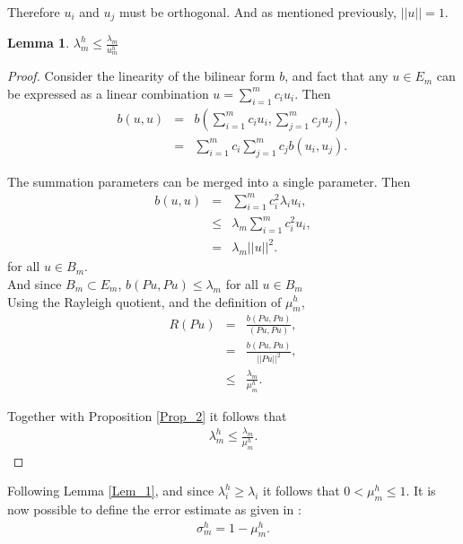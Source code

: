\documentclass[../../main.tex]{subfiles}
\begin{document}
Therefore $u_{i}$ and $u_{j}$ must be orthogonal. And as mentioned previously, $||u|| = 1$.


\newtheorem{Lem_1}{Lemma} \label{Lem_1}
\begin{Lem_1}
	$\displaystyle \lambda_{m}^{h} \leq \frac{\lambda_{m}}{u_{m}^{h}}$
\end{Lem_1}
\begin{proof}
	Consider the linearity of the bilinear form $b$, and fact that any $u \in E_m$ can be expressed as a linear combination $u = \sum_{i=1}^{m} c_{i}u_{i}$. Then
	\begin{eqnarray*}
	b(u,u) &=& b\left(\sum_{i=1}^{m} c_{i}u_{i},\sum_{j=1}^{m} c_{j}u_{j}\right),\\
			&=& \sum_{i=1}^{m} c_{i}\sum_{j=1}^{m} c_{j} b(u_{i},u_{j}).
	\end{eqnarray*}

	The summation parameters can be merged into a single parameter. Then
	\begin{eqnarray*}
		b(u,u)  & = & \sum_{i=1}^{m} c_{i}^{2} \lambda_{i} u_i,\\
				& \leq & \lambda_{m}\sum_{i=1}^{m} c_{i}^{2} u_i,\\
				& = & \lambda_{m}||u||^2.
	\end{eqnarray*} for all $u \in B_m$.\\
	
	
	And since $B_{m} \subset E_{m}$, $b(Pu,Pu) \leq \lambda_{m}$ for all $u\in B_{m}$\\
	
	Using the Rayleigh quotient, and the definition of $\mu_{m}^{h}$, 
	\begin{eqnarray*}
		R(Pu) &=& \frac{b(Pu,Pu)}{(Pu,Pu)},\\
			&=& \frac{b(Pu,Pu)}{||Pu||^{2}},\\
			&\leq & \frac{\lambda_{m}}{\mu_{m}^{h}}.
	\end{eqnarray*}

	Together with Proposition \ref{Prop_2} it follows that
	\begin{eqnarray*}
		\lambda_{m}^{h} \leq \frac{\lambda_{m}}{\mu_{m}^{h}}.
	\end{eqnarray*}
\end{proof}

Following Lemma \ref{Lem_1}, and since $\lambda_{i}^{h} \geq \lambda_{i}$ it follows that $0 < \mu_{m}^{h} \leq 1$. It is now possible to define the error estimate as given in \cite{SF73}:
\begin{eqnarray*}
	\sigma_{m}^{h} = 1 - \mu_{m}^{h}.
\end{eqnarray*}
\end{document}
